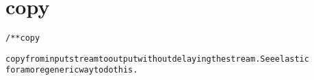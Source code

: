\section{copy}
\begin{shaded}
\begin{alltt}
/** copy

copy from input stream to output without delaying the stream.   See elastic
for a more generic way to do this.

\end{alltt}
\end{shaded}
